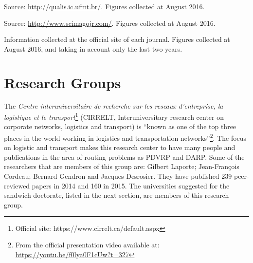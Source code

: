 \documentclass[english,plano-doutorado,twoside]{iiufrgs}
\begin{document}
\begin{table}[H]
\begin{threeparttable}[b]
\begin{tabular}{p{}|c|c|c}
	\end{tabular}
	\label{tab:periodicosEconferencias}
	\begin{tablenotes}
	  \item[1]{{\footnotesize Source: \url{http://qualis.ic.ufmt.br/}. Figures collected at August 2016.}}
	  \item[2]{{\footnotesize Source: \url{http://www.scimagojr.com/}. Figures collected at August 2016.}}
	  \item[3]{{\footnotesize Information collected at the official site of each journal. Figures collected at August 2016, and taking in account only the last two years.}}	  
	\end{tablenotes}
	\end{threeparttable}
\end{table}

\section{Research Groups}
\label{sec:resgroups}

The \textit{Centre interuniversitaire de recherche sur les reseaux d'entreprise, la logistique et le transport}\footnote{Official site: https://www.cirrelt.ca/default.aspx} (CIRRELT, Interuniversitary research center on corporate networks, logistics and transport) is ``known as one of the top three places in the world working in logistics and transportation networks''\footnote{From the official presentation video available at: \url{https://youtu.be/f0lya0F1cUw?t=327}}. The focus on logistic and transport makes this research center to have many people and publications in the area of routing problems as PDVRP and DARP. Some of the researchers that are members of this group are: Gilbert Laporte; Jean-François Cordeau; Bernard Gendron and Jacques Desrosier. They have published 239 peer-reviewed papers in 2014 and 160 in 2015. The universities suggested for the sandwich doctorate, listed in the next section, are members of this research group.

\end{document}
